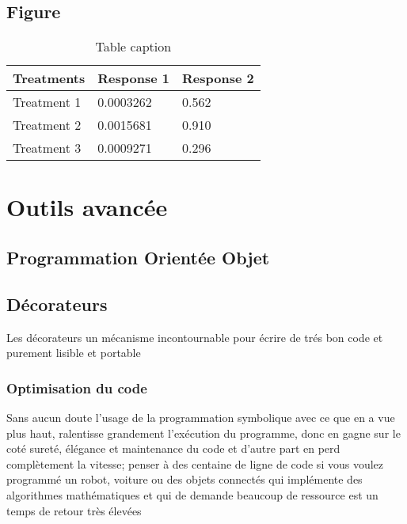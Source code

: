 \documentclass[11pt,fleqn]{book} %
\begin{document}
\section{Figure}

\begin{table}[h]
\centering
\begin{tabular}{l l l}
\toprule
\textbf{Treatments} & \textbf{Response 1} & \textbf{Response 2}\\
\midrule
Treatment 1 & 0.0003262 & 0.562 \\
Treatment 2 & 0.0015681 & 0.910 \\
Treatment 3 & 0.0009271 & 0.296 \\
\bottomrule
\end{tabular}
\caption{Table caption}
\end{table}

%


\chapter{Outils avancée}

\section{Programmation Orientée Objet}
\section{D\'ecorateurs}
Les d\'ecorateurs un m\'ecanisme incontournable pour \'ecrire de tr\'es bon code et purement 
lisible et portable
\subsection{Optimisation du code}
Sans aucun doute l'usage de la programmation symbolique avec ce que en a vue plus haut, ralentisse grandement l'exécution du programme, donc en gagne sur le coté sureté, élégance
et maintenance du code et d'autre part en perd complètement la vitesse; penser à des centaine de ligne de code si vous voulez programmé un robot, voiture ou des objets connectés qui implémente des algorithmes mathématiques et qui de demande beaucoup de ressource est un temps de retour très élevées 
\end{document}
